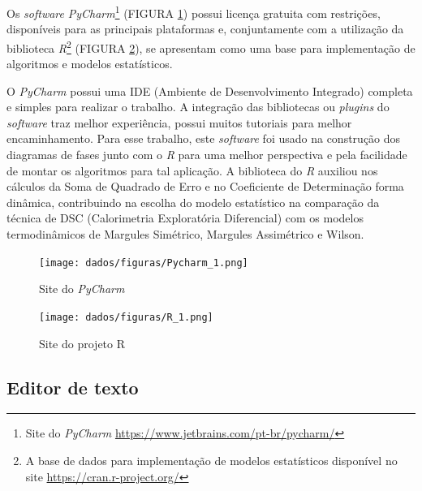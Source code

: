 Os \textit{software} \textit{PyCharm}\footnote{Site do \textit{PyCharm} \url{https://www.jetbrains.com/pt-br/pycharm/}} (FIGURA \ref{fig:15}) possui licença gratuita com restrições, disponíveis para as principais plataformas e, conjuntamente com a utilização da biblioteca \textit{R}\footnote{A base de dados para implementação de modelos estatísticos disponível no site \url{https://cran.r-project.org/}} (FIGURA \ref{fig:16}), se apresentam como uma base para implementação de algoritmos e modelos estatísticos. 

O \textit{PyCharm} possui uma IDE (Ambiente de Desenvolvimento Integrado) completa e simples para realizar o trabalho. A integração das bibliotecas ou  \textit{plugins} do \textit{software} traz melhor experiência, possui muitos tutoriais para melhor encaminhamento. Para esse trabalho, este \textit{software} foi usado na construção dos diagramas de fases junto com o \textit{R} para uma melhor perspectiva e pela facilidade de montar os algoritmos para tal aplicação. A biblioteca do \textit{R} auxiliou nos cálculos da Soma de Quadrado de Erro e no Coeficiente de Determinação forma dinâmica, contribuindo na escolha do modelo estatístico na comparação da técnica de DSC (Calorimetria Exploratória Diferencial) com os modelos termodinâmicos de Margules Simétrico, Margules Assimétrico e Wilson.
\begin{figure}[H]
	\centering
	\texttt{[image: dados/figuras/Pycharm\_1.png]}
	\caption[Site do \textit{PyCharm}]{Site do \textit{PyCharm}}
	\label{fig:15}
\end{figure}
\begin{figure}[H]
	\centering
	\texttt{[image: dados/figuras/R\_1.png]}
	\caption[Site do projeto R]{Site do projeto R}
	\label{fig:16}
\end{figure}

\subsection{Editor de texto \LaTeXe}

